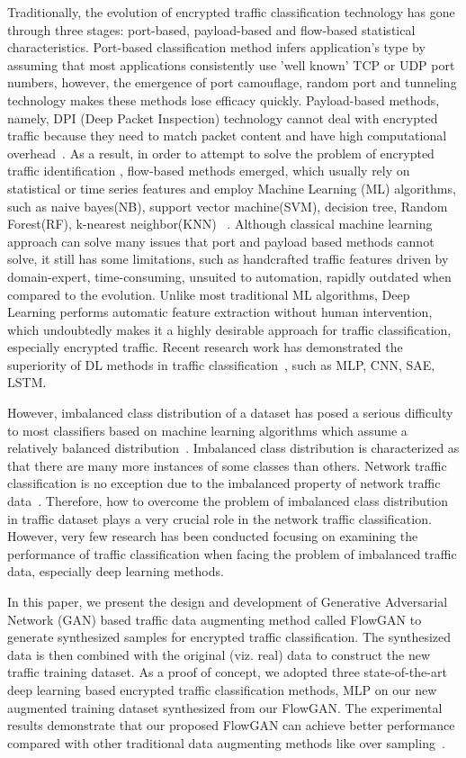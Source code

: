 \documentclass[letterpaper,12pt]{article}
\begin{document}
Traditionally, the evolution of encrypted traffic classification technology has gone through three stages: port-based, payload-based and flow-based statistical characteristics. Port-based classification method infers application's type by assuming that most applications consistently use 'well known' TCP or UDP port numbers, however, the emergence of port camouflage, random port and tunneling technology makes these methods lose efficacy quickly. Payload-based methods, namely, DPI (Deep Packet Inspection) technology cannot deal with encrypted traffic because they need to match packet content and have high computational overhead~\cite{SDN-HGU,PhoneNumber}. As a result, in order to attempt to solve the problem of encrypted traffic identification , flow-based methods emerged, which usually rely on statistical or time series features and employ Machine Learning (ML) algorithms,  such as naive bayes(NB), support vector machine(SVM), decision tree, Random Forest(RF), k-nearest neighbor(KNN) ~\cite{Pescape2008}. Although classical machine learning approach can solve many issues that port and payload based methods cannot solve, it still has some limitations, such as handcrafted traffic features driven by domain-expert, time-consuming, unsuited to automation, rapidly outdated when compared to the evolution. Unlike most traditional ML algorithms, Deep Learning performs automatic feature extraction without human intervention, which undoubtedly makes it a highly desirable approach for traffic classification, especially encrypted traffic.  Recent research work has demonstrated the superiority of DL methods in traffic classification~\cite{MobileTC-2018}, such as MLP, CNN, SAE, LSTM. 


However, imbalanced class distribution of a dataset has posed a serious difficulty to most classifiers based on machine learning algorithms which assume a relatively balanced distribution~\cite{Japkowicz:2002}. Imbalanced class distribution is characterized as that there are many more instances of some classes than others. Network traffic classification is no exception due to the imbalanced property of network traffic data~\cite{Vu2017}. Therefore, how to overcome the problem of imbalanced class distribution in traffic dataset  plays a very crucial role in the network traffic classification. However, very few research has been conducted focusing on examining the performance of traffic classification when facing the problem of imbalanced traffic data, especially deep learning methods.

In this paper, we present the design and development of Generative Adversarial Network (GAN) based traffic data augmenting method called FlowGAN to generate synthesized samples for encrypted traffic classification. The synthesized data is then combined with the original (viz. real) data to construct the new traffic training dataset. As a proof of concept, we adopted three state-of-the-art deep learning based encrypted traffic classification methods, MLP on our new augmented training dataset synthesized from our FlowGAN. The experimental results demonstrate that our proposed FlowGAN can achieve better performance compared with  other traditional data augmenting methods like over sampling~\cite{ROS2004}.
\end{document}
